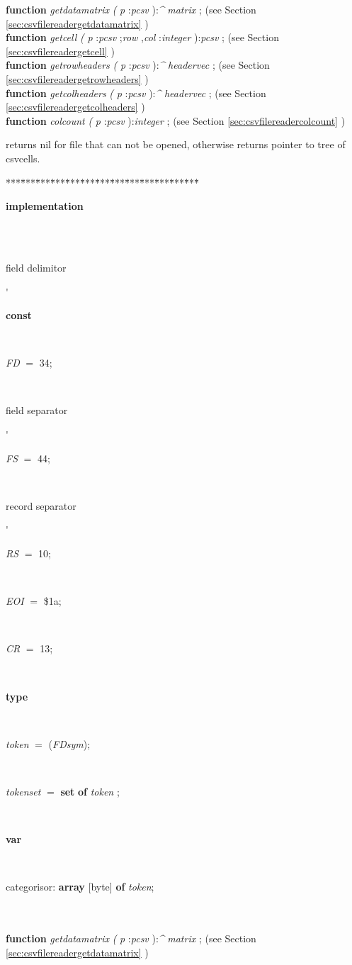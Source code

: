 \begin{tabbing}
\<\textsf{\textbf{function}  \textit{getdatamatrix} \textit{(} \textit{p} :\textit{pcsv} ):\textit{\^{}} \textit{matrix} ;} (see Section \ref{sec:csvfilereadergetdatamatrix} )\\
\<\textsf{\textbf{function}  \textit{getcell} \textit{(} \textit{p} :\textit{pcsv} ;\textit{row} ,\textit{col} :\textit{integer} ):\textit{pcsv} ;} (see Section \ref{sec:csvfilereadergetcell} )\\
\<\textsf{\textbf{function}  \textit{getrowheaders} \textit{(} \textit{p} :\textit{pcsv} ):\textit{\^{}} \textit{headervec} ;} (see Section \ref{sec:csvfilereadergetrowheaders} )\\
\<\textsf{\textbf{function}  \textit{getcolheaders} \textit{(} \textit{p} :\textit{pcsv} ):\textit{\^{}} \textit{headervec} ;} (see Section \ref{sec:csvfilereadergetcolheaders} )\\
\<\textsf{\textbf{function}  \textit{colcount} \textit{(} \textit{p} :\textit{pcsv} ):\textit{integer} ;} (see Section \ref{sec:csvfilereadercolcount} )\\
\end{tabbing}
returns nil for file that can not be opened, otherwise
returns pointer to tree of csvcells.
\begin{tabbing}
***\=***\=***\=***\=***\=***\=***\=***\=***\=***\=***\=***\=***\=\kill
\+ \+ \+ \\
\<\parbox{14cm}{\textsf{\textbf{implementation} }}\\
\\
\<\<\<\parbox{3.5cm}{\scriptsize{field delimitor}}\'\>\>\parbox{14cm}{\textsf{\textbf{const} }}\\
\parbox{14cm}{\textsf{\textit{FD} $=$ 34}; }\\
\<\<\<\parbox{3.5cm}{\scriptsize{field separator}}\'\>\>\>\parbox{14cm}{\textsf{\textit{FS} $=$ 44}; }\\
\<\<\<\parbox{3.5cm}{\scriptsize{record separator}}\'\>\>\>\parbox{14cm}{\textsf{\textit{RS} $=$ 10}; }\\
\parbox{14cm}{\textsf{\textit{EOI} $=$ \$1a}; }\\
\parbox{14cm}{\textsf{\textit{CR} $=$ 13}; }\\
\<\parbox{14cm}{\textsf{\textbf{type} }}\\
\parbox{14cm}{\textsf{\textit{token} $=$ (\textit{FDsym})}; }\\
\parbox{14cm}{\textsf{\textit{tokenset} $=$ \textbf{set} \textbf{of} \textit{token}  }; }\\
\<\parbox{14cm}{\textsf{\textbf{var} }}\\
\parbox{14cm}{categorisor: \textbf{ array } \textsf{\textit{}[byte]} \textbf{ of } \textsf{\textit{token}}; }\\
\\
\<\textsf{\textbf{function}  \textit{getdatamatrix} \textit{(} \textit{p} :\textit{pcsv} ):\textit{\^{}} \textit{matrix} ;} (see Section \ref{sec:csvfilereadergetdatamatrix} )\\
\end{tabbing}
